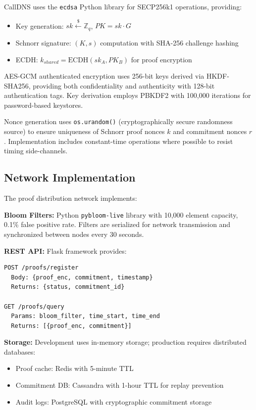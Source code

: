 \documentclass[11pt,twocolumn]{article}
\begin{document}
CallDNS uses the \texttt{ecdsa} Python library for SECP256k1 operations, providing:
\begin{itemize}
\item Key generation: $sk \xleftarrow{\$} \mathbb{Z}_q$, $PK = sk \cdot G$
\item Schnorr signature: $(K, s)$ computation with SHA-256 challenge hashing
\item ECDH: $k_{shared} = \text{ECDH}(sk_A, PK_B)$ for proof encryption
\end{itemize}

AES-GCM authenticated encryption uses 256-bit keys derived via HKDF-SHA256, providing both confidentiality and authenticity with 128-bit authentication tags. Key derivation employs PBKDF2 with 100,000 iterations for password-based keystores.

Nonce generation uses \texttt{os.urandom()} (cryptographically secure randomness source) to ensure uniqueness of Schnorr proof nonces $k$ and commitment nonces $r$. Implementation includes constant-time operations where possible to resist timing side-channels.

\subsection{Network Implementation}

The proof distribution network implements:

\textbf{Bloom Filters:} Python \texttt{pybloom-live} library with 10,000 element capacity, 0.1\% false positive rate. Filters are serialized for network transmission and synchronized between nodes every 30 seconds.

\textbf{REST API:} Flask framework provides:
\begin{verbatim}
POST /proofs/register
  Body: {proof_enc, commitment, timestamp}
  Returns: {status, commitment_id}

GET /proofs/query
  Params: bloom_filter, time_start, time_end
  Returns: [{proof_enc, commitment}]
\end{verbatim}

\textbf{Storage:} Development uses in-memory storage; production requires distributed databases:
\begin{itemize}
\item Proof cache: Redis with 5-minute TTL
\item Commitment DB: Cassandra with 1-hour TTL for replay prevention
\item Audit logs: PostgreSQL with cryptographic commitment storage
\end{itemize}
\end{document}
